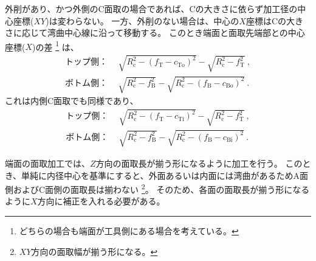 \clearpage
外削があり、かつ外側のC面取の場合であれば、Cの大きさに依らず加工径の中心座標($XY$)は変わらない。
一方、外削のない場合は、中心の$X$座標はCの大きさに応じて湾曲中心線に沿って移動する。
このとき端面と面取先端部との中心座標($X$)の差
\footnote{どちらの場合も端面が工具側にある場合を考えている。}
は、
\begin{align*}
  \text{トップ側：}&~~
  \sqrt{R_\mathrm c^2-\left(f_\mathrm T-c_\mathrm{To}\right)^2}-\sqrt{R_\mathrm c^2-f_\mathrm T^2}\ ,\\
  \text{ボトム側：}&~~
  \sqrt{R_\mathrm c^2-f_\mathrm B^2}-\sqrt{R_\mathrm c^2-\left(f_\mathrm B-c_\mathrm{Bo}\right)^2}\ .
\end{align*}
これは内側C面取でも同様であり、
\begin{align*}
  \text{トップ側：}&~~
  \sqrt{R_\mathrm c^2-\left(f_\mathrm T-c_\mathrm{Ti}\right)^2}-\sqrt{R_\mathrm c^2-f_\mathrm T^2}\ ,\\
  \text{ボトム側：}&~~
  \sqrt{R_\mathrm c^2-f_\mathrm B^2}-\sqrt{R_\mathrm c^2-\left(f_\mathrm B-c_\mathrm{Bi}\right)^2}\ .
\end{align*}



端面の面取加工では、$Z$方向の面取長が揃う形になるように加工を行う。
このとき、単純に内径中心を基準にすると、外面あるいは内面には湾曲があるためA面側およびC面側の面取長は揃わない
\footnote{$XY$方向の面取幅が揃う形になる。}。
そのため、各面の面取長が揃う形になるように$X$方向に補正を入れる必要がある。













